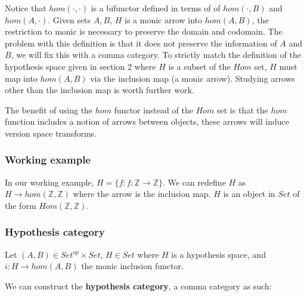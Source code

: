 \documentclass{article}
\theoremstyle{definition}
\begin{document}
Notice that $hom(\cdot, \cdot)$ is a bifunctor defined in terms of of $hom(\cdot,B)$ and $hom(A,\cdot)$. Given sets $A, B$, $H$ is a monic arrow into $hom(A,B)$, the restriction to monic is necessary to preserve the domain and codomain. The problem with this definition is that it does not preserve the information of $A$ and $B$, we will fix this with a comma category. To strictly match the definition of the hypothesis space given in section 2 where $H$ is a subset of the $Hom$ set, $H$ must map into $hom(A,B)$ via the inclusion map (a monic arrow). Studying arrows other than the inclusion map is worth further work. 

The benefit of using the $hom$ functor instead of the $Hom$ set is that the $hom$ function includes a notion of arrows between objects, these arrows will induce version space transforms. 

\subsubsection{Working example}
In our working example, $H=\{f: f: \mathbb{Z} \rightarrow \mathbb{Z}\}$. We can redefine $H$ as $H \rightarrow hom(\mathbb{Z}, \mathbb{Z})$ where the arrow is the inclusion map. $H$ is an object in $Set$ of the form $Hom(\mathbb{Z},\mathbb{Z})$.

\subsubsection{Hypothesis category}
Let $(A, B) \in Set^{op} \times Set$, $H \in Set$ where $H$ is a hypothesis space, and $i:H \rightarrow hom(A,B)$ the monic inclusion functor. 

We can construct the \textbf{hypothesis category}, a comma category as such: 
\end{document}
